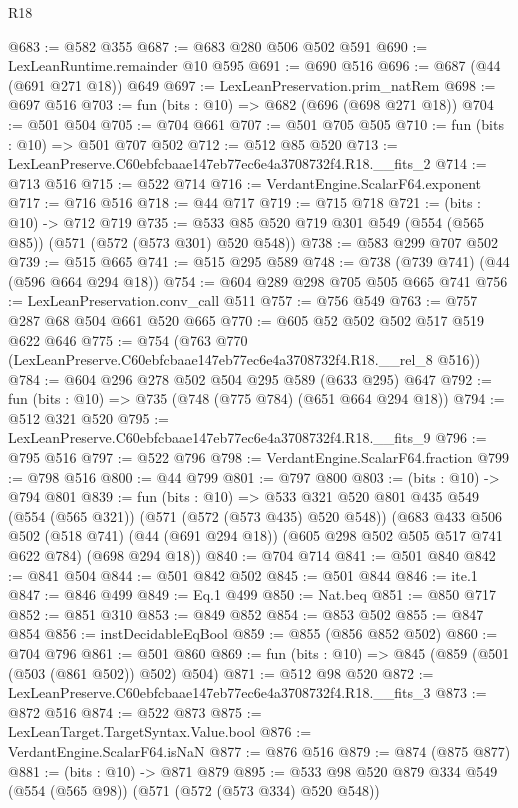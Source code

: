 \begin{lexlean}{R18}
\begin{coremodule}
@683 := @582 @355
@687 := @683 @280 @506 @502 @591
@690 := LexLeanRuntime.remainder @10 @595
@691 := @690 @516
@696 := @687 (@44 (@691 @271 @18)) @649
@697 := LexLeanPreservation.prim_natRem
@698 := @697 @516
@703 := fun (bits : @10) => @682 (@696 (@698 @271 @18))
@704 := @501 @504
@705 := @704 @661
@707 := @501 @705 @505
@710 := fun (bits : @10) => @501 @707 @502
@712 := @512 @85 @520
@713 := LexLeanPreserve.C60ebfcbaae147eb77ec6e4a3708732f4.R18.__fits_2
@714 := @713 @516
@715 := @522 @714
@716 := VerdantEngine.ScalarF64.exponent
@717 := @716 @516
@718 := @44 @717
@719 := @715 @718
@721 := (bits : @10) -> @712 @719
@735 := @533 @85 @520 @719 @301 @549 (@554 (@565 @85)) (@571 (@572 (@573 @301) @520 @548))
@738 := @583 @299 @707 @502
@739 := @515 @665
@741 := @515 @295 @589
@748 := @738 (@739 @741) (@44 (@596 @664 @294 @18))
@754 := @604 @289 @298 @705 @505 @665 @741
@756 := LexLeanPreservation.conv_call @511
@757 := @756 @549
@763 := @757 @287 @68 @504 @661 @520 @665
@770 := @605 @52 @502 @502 @517 @519 @622 @646
@775 := @754 (@763 @770 (LexLeanPreserve.C60ebfcbaae147eb77ec6e4a3708732f4.R18.__rel_8 @516))
@784 := @604 @296 @278 @502 @504 @295 @589 (@633 @295) @647
@792 := fun (bits : @10) => @735 (@748 (@775 @784) (@651 @664 @294 @18))
@794 := @512 @321 @520
@795 := LexLeanPreserve.C60ebfcbaae147eb77ec6e4a3708732f4.R18.__fits_9
@796 := @795 @516
@797 := @522 @796
@798 := VerdantEngine.ScalarF64.fraction
@799 := @798 @516
@800 := @44 @799
@801 := @797 @800
@803 := (bits : @10) -> @794 @801
@839 := fun (bits : @10) =>
  @533
    @321
    @520
    @801
    @435
    @549
    (@554 (@565 @321))
    (@571 (@572 (@573 @435) @520 @548))
    (@683
      @433
      @506
      @502
      (@518 @741)
      (@44 (@691 @294 @18))
      (@605 @298 @502 @505 @517 @741 @622 @784)
      (@698 @294 @18))
@840 := @704 @714
@841 := @501 @840
@842 := @841 @504
@844 := @501 @842 @502
@845 := @501 @844
@846 := ite.{1}
@847 := @846 @499
@849 := Eq.{1} @499
@850 := Nat.beq
@851 := @850 @717
@852 := @851 @310
@853 := @849 @852
@854 := @853 @502
@855 := @847 @854
@856 := instDecidableEqBool
@859 := @855 (@856 @852 @502)
@860 := @704 @796
@861 := @501 @860
@869 := fun (bits : @10) => @845 (@859 (@501 (@503 (@861 @502)) @502) @504)
@871 := @512 @98 @520
@872 := LexLeanPreserve.C60ebfcbaae147eb77ec6e4a3708732f4.R18.__fits_3
@873 := @872 @516
@874 := @522 @873
@875 := LexLeanTarget.TargetSyntax.Value.bool
@876 := VerdantEngine.ScalarF64.isNaN
@877 := @876 @516
@879 := @874 (@875 @877)
@881 := (bits : @10) -> @871 @879
@895 := @533 @98 @520 @879 @334 @549 (@554 (@565 @98)) (@571 (@572 (@573 @334) @520 @548))

\end{coremodule}
\end{lexlean}
